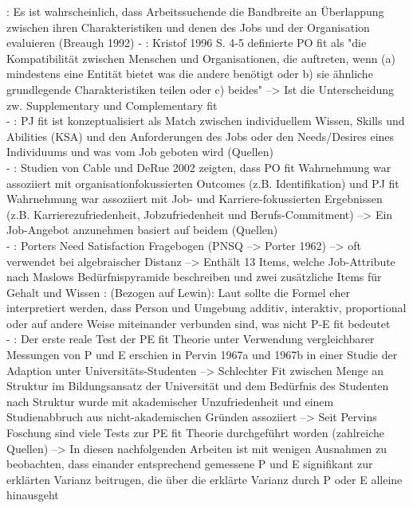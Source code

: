 \cite[S. 2]{carless:2005}: Es ist wahrscheinlich, dass Arbeitssuchende die Bandbreite an Überlappung zwischen ihren Charakteristiken und denen des Jobs und der Organisation evaluieren (Breaugh 1992)
- \cite[S. 2]{carless:2005}: Kristof 1996 S. 4-5 definierte PO fit als "die Kompatibilität zwischen Menschen und Organisationen, die auftreten, wenn (a) mindestens eine Entität bietet was die andere benötigt oder b) sie ähnliche grundlegende Charakteristiken teilen oder c) beides" --> Ist die Unterscheidung zw. Supplementary und Complementary fit \\
- \cite[S. 2]{carless:2005}: PJ fit ist konzeptualisiert als Match zwischen individuellem Wissen, Skills und Abilities (KSA) und den Anforderungen des Jobs oder den Needs/Desires eines Individuums und was vom Job geboten wird (Quellen) \\
- \cite[S. 3]{carless:2005}: Studien von Cable und DeRue 2002 zeigten, dass PO fit Wahrnehmung war assoziiert mit organisationfokussierten Outcomes (z.B. Identifikation) und PJ fit Wahrnehmung war assoziiert mit Job- und Karriere-fokussierten Ergebnissen (z.B. Karrierezufriedenheit, Jobzufriedenheit und Berufs-Commitment) --> Ein Job-Angebot anzunehmen basiert auf beidem (Quellen) \\
- \cite[S. 27]{edwards:1991}: Porters Need Satisfaction Fragebogen (PNSQ --> Porter 1962) --> oft verwendet bei algebraischer Distanz --> Enthält 13 Items, welche Job-Attribute nach Maslows Bedürfnispyramide beschreiben und zwei zusätzliche Items für Gehalt und Wissen
\cite[S. 8]{edwards:2008}: (Bezogen auf Lewin): Laut \textcite{schneider:2001} sollte die Formel eher interpretiert werden, dass Person und Umgebung additiv, interaktiv, proportional oder auf andere Weise miteinander verbunden sind, was nicht P-E fit bedeutet \\
- \cite[S. 8]{caplan:1987}: Der erste reale Test der PE fit Theorie unter Verwendung vergleichbarer Messungen von P und E erschien in Pervin 1967a und 1967b in einer Studie der Adaption unter Universitäts-Studenten --> Schlechter Fit zwischen Menge an Struktur im Bildungsansatz der Universität und dem Bedürfnis des Studenten nach Struktur wurde mit akademischer Unzufriedenheit und einem Studienabbruch aus nicht-akademischen Gründen assoziiert --> Seit Pervins Foschung sind viele Tests zur PE fit Theorie durchgeführt worden (zahlreiche Quellen) --> In diesen nachfolgenden Arbeiten ist mit wenigen Ausnahmen zu beobachten, dass einander entsprechend gemessene P und E signifikant zur erklärten Varianz beitrugen, die über die erklärte Varianz durch P oder E alleine hinausgeht \\

